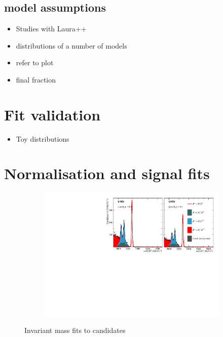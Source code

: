 \subsection{\decay{\Bp}{\Dsp \Kp \Km} model assumptions}
\label{sec:B2DsPhi_B2DsKKModel}

{\color{Red}
\begin{itemize}
\item Studies with Laura++
\item distributions of a number of models
\item refer to \Dsp\Kp\Km plot
\item final fraction
\end{itemize}
}

\section{Fit validation}
\label{sec:B2DsPhi_fitstrategy}

{\color{Red}
\begin{itemize}
\item Toy distributions
\end{itemize}
}

\section{Normalisation and signal fits}




\begin{figure}[!h]
    \centering
    \begin{subfigure}[t]{1.0\textwidth}
        \includegraphics[width=1.0\textwidth]{figs/Appendix_FitCategories/canvas_DsD0_merged_both_summed_splitHel_splitKKPi_s21_s21r1_s24_s26.pdf}
    \end{subfigure}
    \caption{Invariant mass fits to \decay{\Bp}{\Dsp\Dzb} candidates}
\end{figure}


